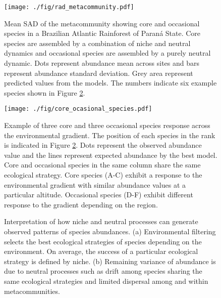 \documentclass[12pt]{article}
\begin{document}
\begin{figure}[!h]
 \begin{center}
\texttt{[image: ./fig/rad\_metacommunity.pdf]}
\end{center}
\caption{Mean SAD of the metacommunity showing core and occasional species in a Brazilian Atlantic Rainforest of Paran\'a State.
  Core species are assembled by a combination of niche and neutral dynamics and occasional species are assembled by a purely neutral dynamic. %
  Dots represent abundance mean across sites and bars represent abundance standard deviation. Grey area represent predicted values from the models. The numbers indicate six example species shown in Figure \ref{fig:spp}.}\label{fig:rad} %
\end{figure}


\begin{figure}[!h]
 \begin{center}
\texttt{[image: ./fig/core\_ocasional\_species.pdf]}
\end{center}
\caption{Example of three core and three occasional species response across the environmental gradient. The position of each species in the rank is indicated in Figure \ref{fig:spp}. Dots represent the observed abundance value and the lines represent expected abundance by the best model. Core and occasional species in the same column share the same ecological strategy. Core species (A-C) exhibit a response to the environmental gradient with similar abundance values at a particular altitude. Occasional species (D-F) exhibit different response to the gradient depending on the region.} \label{fig:spp}
\end{figure}


\begin{figure}[!ht]
 \begin{center}
\end{center}
\caption{Interpretation of how niche and neutral processes can generate observed patterns of species abundances. (a) Environmental filtering selects the best ecological strategies of species depending on the environment. On average, the success of a particular ecological strategy is defined by niche. (b) Remaining variance of abundance is due to neutral processes such as drift among species sharing the same ecological strategies and limited dispersal among and within metacommunities.} \label{fig:final}
\end{figure}



\end{document}
